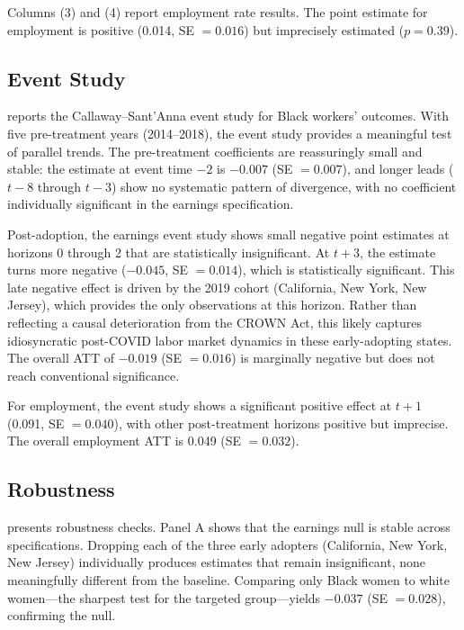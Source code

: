 \documentclass[12pt]{article}
\begin{document}
Columns (3) and (4) report employment rate results. The point estimate for employment is positive (0.014, SE $= 0.016$) but imprecisely estimated ($p = 0.39$).

\subsection{Event Study}



 reports the Callaway--Sant'Anna event study for Black workers' outcomes. With five pre-treatment years (2014--2018), the event study provides a meaningful test of parallel trends. The pre-treatment coefficients are reassuringly small and stable: the estimate at event time $-2$ is $-0.007$ (SE $= 0.007$), and longer leads ($t-8$ through $t-3$) show no systematic pattern of divergence, with no coefficient individually significant in the earnings specification.

Post-adoption, the earnings event study shows small negative point estimates at horizons 0 through 2 that are statistically insignificant. At $t+3$, the estimate turns more negative ($-0.045$, SE $= 0.014$), which is statistically significant. This late negative effect is driven by the 2019 cohort (California, New York, New Jersey), which provides the only observations at this horizon. Rather than reflecting a causal deterioration from the CROWN Act, this likely captures idiosyncratic post-COVID labor market dynamics in these early-adopting states. The overall ATT of $-0.019$ (SE $= 0.016$) is marginally negative but does not reach conventional significance.

For employment, the event study shows a significant positive effect at $t+1$ (0.091, SE $= 0.040$), with other post-treatment horizons positive but imprecise. The overall employment ATT is 0.049 (SE $= 0.032$).

\subsection{Robustness}



 presents robustness checks. Panel A shows that the earnings null is stable across specifications. Dropping each of the three early adopters (California, New York, New Jersey) individually produces estimates that remain insignificant, none meaningfully different from the baseline. Comparing only Black women to white women---the sharpest test for the targeted group---yields $-0.037$ (SE $= 0.028$), confirming the null.
\end{document}
